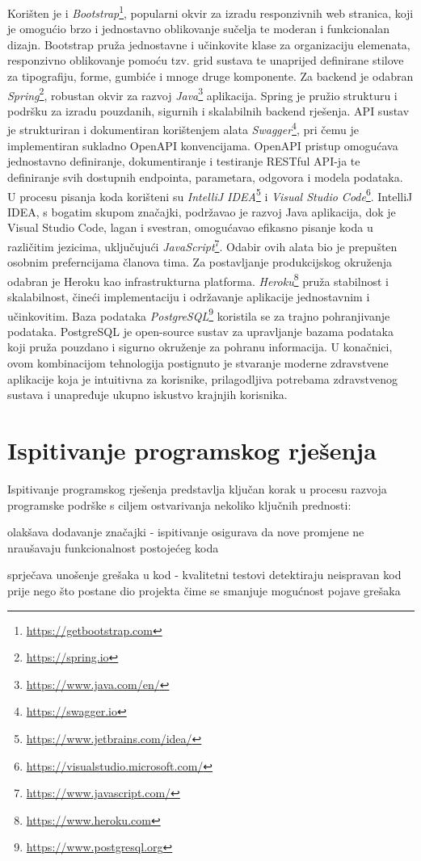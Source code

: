 			 Korišten je i \textit{Bootstrap}\footnote{\url{https://getbootstrap.com}}, popularni okvir za izradu responzivnih web stranica, koji je omogućio brzo i jednostavno oblikovanje sučelja te moderan i funkcionalan dizajn. Bootstrap pruža jednostavne i učinkovite klase za organizaciju elemenata, responzivno oblikovanje pomoću tzv. grid sustava te unaprijed definirane stilove za tipografiju, forme, gumbiće i mnoge druge komponente.
			 Za backend je odabran \textit{Spring}\footnote{\url{https://spring.io}}, robustan okvir za razvoj \textit{Java}\footnote{\url{https://www.java.com/en/}} aplikacija. Spring je pružio strukturu i podršku za izradu pouzdanih, sigurnih i skalabilnih backend rješenja.
			 API sustav je strukturiran i dokumentiran korištenjem alata \textit{Swagger}\footnote{\url{https://swagger.io}}, pri čemu je implementiran sukladno OpenAPI konvencijama. OpenAPI pristup omogućava jednostavno definiranje, dokumentiranje i testiranje RESTful API-ja te definiranje svih dostupnih endpointa, parametara, odgovora i modela podataka.
			 U procesu pisanja koda korišteni su \textit{IntelliJ IDEA}\footnote{\url{https://www.jetbrains.com/idea/}} i \textit{Visual Studio Code}\footnote{\url{https://visualstudio.microsoft.com/}}. IntelliJ IDEA, s bogatim skupom značajki, podržavao je razvoj Java aplikacija, dok je Visual Studio Code, lagan i svestran, omogućavao efikasno pisanje koda u različitim jezicima, uključujući \textit{JavaScript}\footnote{\url{https://www.javascript.com/}}.
			 Odabir ovih alata bio je prepušten osobnim preferncijama članova tima.
			 Za postavljanje produkcijskog okruženja odabran je Heroku kao infrastrukturna platforma. \textit{Heroku}\footnote{\url{https://www.heroku.com}} pruža stabilnost i skalabilnost, čineći implementaciju i održavanje aplikacije jednostavnim i učinkovitim.
			 Baza podataka \textit{PostgreSQL}\footnote{\url{https://www.postgresql.org}} koristila se za trajno pohranjivanje podataka. PostgreSQL je open-source sustav za upravljanje bazama podataka koji pruža pouzdano i sigurno okruženje za pohranu informacija.
			 U konačnici, ovom kombinacijom tehnologija postignuto je stvaranje moderne zdravstvene aplikacije koja je intuitivna za korisnike, prilagodljiva potrebama zdravstvenog sustava i unapređuje ukupno iskustvo krajnjih korisnika.
			\eject 
	
		\section{Ispitivanje programskog rješenja}
			Ispitivanje programskog rješenja predstavlja ključan korak u procesu razvoja programske podrške s ciljem ostvarivanja nekoliko ključnih prednosti:
			\begin{packed_item}
				\item olakšava dodavanje značajki - ispitivanje osigurava da nove promjene ne nraušavaju funkcionalnost postojećeg koda
				\item sprječava unošenje grešaka u kod - kvalitetni testovi detektiraju neispravan kod prije nego što postane dio projekta čime se smanjuje mogućnost pojave grešaka
			\end{packed_item}
			
